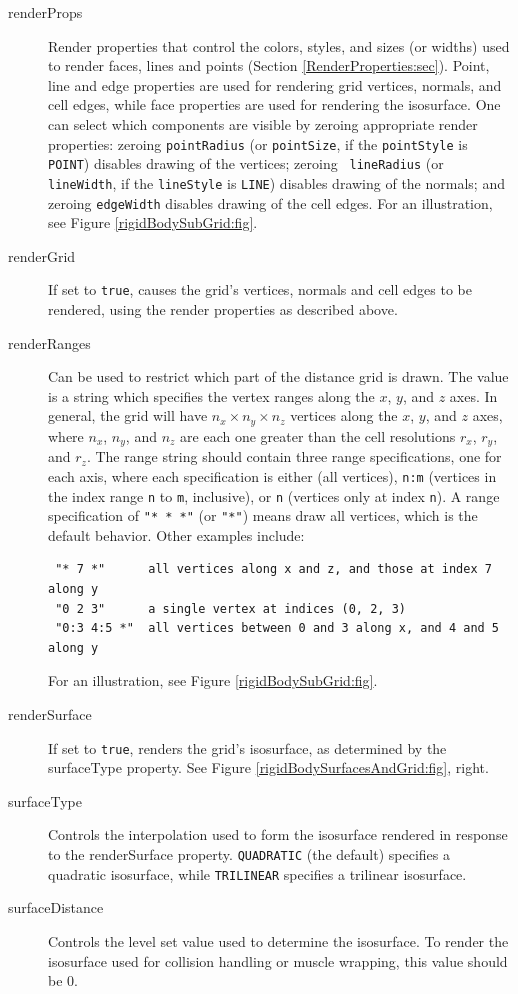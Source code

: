 \begin{description}

\item[renderProps] Render properties that control the colors, styles,
and sizes (or widths) used to render faces, lines and points (Section
\ref{RenderProperties:sec}). Point, line and edge properties are used
for rendering grid vertices, normals, and cell edges, while face
properties are used for rendering the isosurface.
One can select which
components are visible by zeroing appropriate render properties:
zeroing {\tt pointRadius} (or {\tt pointSize}, if the {\tt pointStyle}
is {\tt POINT}) disables drawing of the vertices; zeroing {\tt
lineRadius} (or {\tt lineWidth}, if the {\tt lineStyle} is {\tt LINE})
disables drawing of the normals; and zeroing {\tt edgeWidth}
disables drawing of the cell edges. For an illustration,
see Figure \ref{rigidBodySubGrid:fig}.

\item[renderGrid] If set to {\tt true}, causes the grid's vertices,
normals and cell edges to be rendered, using the render properties as
described above.

\item[renderRanges] Can be used to restrict which part of the distance
grid is drawn. The value is a string which specifies the vertex ranges
along the $x$, $y$, and $z$ axes. In general, the grid will have $n_x
\times n_y \times n_z$ vertices along the $x$, $y$, and $z$ axes,
where $n_x$, $n_y$, and $n_z$ are each one greater than the cell
resolutions $r_x$, $r_y$, and $r_z$. The range string should contain
three range specifications, one for each axis, where each
specification is either {\tt *} (all vertices), {\tt n:m} (vertices in
the index range {\tt n} to {\tt m}, inclusive), or {\tt n} (vertices
only at index {\tt n}). A range specification of {\tt "* * *"} (or
{\tt "*"}) means draw all vertices, which is the default
behavior. Other examples include:
\begin{verbatim}
 "* 7 *"      all vertices along x and z, and those at index 7 along y
 "0 2 3"      a single vertex at indices (0, 2, 3)
 "0:3 4:5 *"  all vertices between 0 and 3 along x, and 4 and 5 along y
\end{verbatim}
For an illustration, see Figure \ref{rigidBodySubGrid:fig}.

\item[renderSurface] If set to {\tt true}, renders the grid's
isosurface, as determined by the {\sf surfaceType} property.
See Figure \ref{rigidBodySurfacesAndGrid:fig}, right.

\item[surfaceType] Controls the interpolation used to form the
isosurface rendered in response to the {\sf renderSurface}
property. {\tt QUADRATIC} (the default) specifies a quadratic
isosurface, while {\tt TRILINEAR} specifies a trilinear isosurface.

\item[surfaceDistance] Controls the level set value used to determine
the isosurface. To render the isosurface used for collision
handling or muscle wrapping, this value should be 0.

\end{description}

